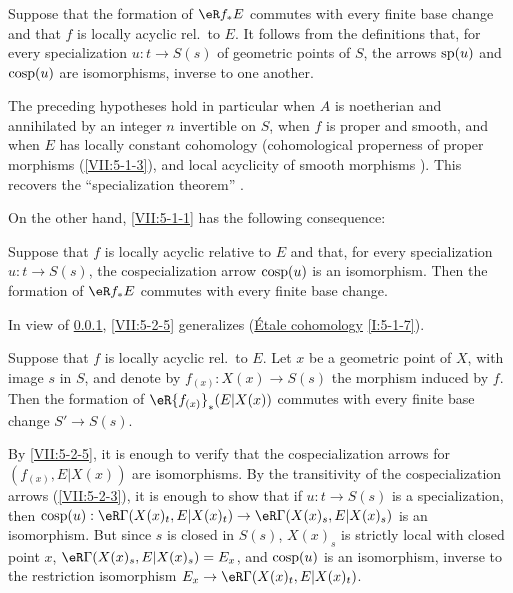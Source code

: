 \subsubsection{}\label{VII:5-2-4}

Suppose that the formation of $\eR f_\ast E$ commutes with every finite base
change and that $f$ is locally acyclic rel.\ to $E$. It follows from the
definitions that, for every specialization $u:t\to S(s)$ of geometric points
of $S$, the arrows $\operatorname{sp}(u)$ and $\operatorname{cosp}(u)$ are isomorphisms, inverse to one
another.

The preceding hypotheses hold in particular when $A$ is noetherian and
annihilated by an integer $n$ invertible on $S$, when $f$ is proper and smooth,
and when $E$ has locally constant cohomology (cohomological properness of
proper morphisms (\ref{VII:5-1-3}), and local acyclicity of smooth morphisms
\cite[XV]{sga4}). This recovers the ``specialization theorem''
\cite[XVI 2.1]{sga4}.

On the other hand, \ref{VII:5-1-1} has the following consequence:






\begin{proposition}\label{VII:5-2-5}
Suppose that $f$ is locally acyclic relative to $E$ and that, for every
specialization $u:t\to S(s)$, the cospecialization arrow $\operatorname{cosp}(u)$ is an
isomorphism. Then the formation of $\eR f_\ast E$ commutes with every finite
base change.
\end{proposition}

In view of \ref{VII:5-2-4}, \ref{VII:5-2-5} generalizes
(\hyperref[I]{Étale cohomology} \ref{I:5-1-7}).






\begin{corollary}\label{VII:5-2-6}
Suppose that $f$ is locally acyclic rel.\ to $E$. Let $x$ be a geometric
point of $X$, with image $s$ in $S$, and denote by
$f_{(x)}:X(x)\to S(s)$ the morphism induced by $f$. Then the formation of
$\eR {f_{(x)}}_\ast(E|X(x))$ commutes with every finite base change
$S'\to S(s)$.
\end{corollary}

By \ref{VII:5-2-5}, it is enough to verify that the cospecialization arrows
for $(f_{(x)},E|X(x))$ are isomorphisms. By the transitivity of the
cospecialization arrows (\ref{VII:5-2-3}), it is enough to show that if
$u:t\to S(s)$ is a specialization, then
$\cosp(u):\eR\Gamma(X(x)_t,E|X(x)_t)\to \eR\Gamma(X(x)_s,E|X(x)_s)$ is an
isomorphism. But since $s$ is closed in $S(s)$, $X(x)_s$ is strictly local
with closed point $x$, $\eR\Gamma(X(x)_s,E|X(x)_s)=E_x$, and $\operatorname{cosp}(u)$ is an
isomorphism, inverse to the restriction isomorphism
$E_x\to \eR\Gamma(X(x)_t,E|X(x)_t)$.






